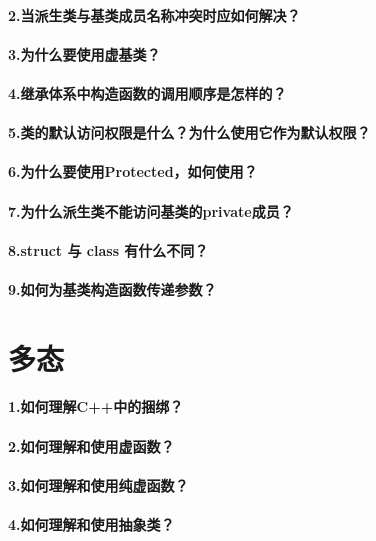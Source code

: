 \documentclass[UTF8,a4paper,8pt]{ctexart}
\begin{document}
	 \paragraph{2.当派生类与基类成员名称冲突时应如何解决？}
	 \paragraph{3.为什么要使用虚基类？}
	 \paragraph{4.继承体系中构造函数的调用顺序是怎样的？}
	 \paragraph{5.类的默认访问权限是什么？为什么使用它作为默认权限？}
	 \paragraph{6.为什么要使用Protected，如何使用？}
	 \paragraph{7.为什么派生类不能访问基类的private成员？}
	 \paragraph{8.struct 与 class 有什么不同？}
	 \paragraph{9.如何为基类构造函数传递参数？}    
	 
\section*{多态}
	 \paragraph{1.如何理解C++中的捆绑？} 
	 \paragraph{2.如何理解和使用虚函数？}
	 \paragraph{3.如何理解和使用纯虚函数？}
	 \paragraph{4.如何理解和使用抽象类？}
\end{document}
